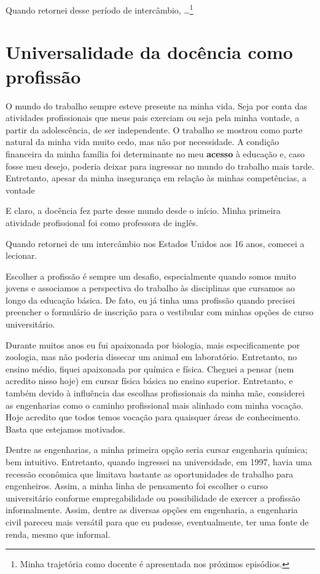 \documentclass[
]{book}
\begin{document}
Quando retornei desse período de intercâmbio, \ldots{}\footnote{Minha
  trajetória como docente é apresentada nos próximos episódios.}

\hypertarget{universalidade-da-docuxeancia-como-profissuxe3o}{%
\chapter{Universalidade da docência como
profissão}\label{universalidade-da-docuxeancia-como-profissuxe3o}}

O mundo do trabalho sempre esteve presente na minha vida. Seja por conta
das atividades profissionais que meus pais exerciam ou seja pela minha
vontade, a partir da adolescência, de ser independente. O trabalho se
mostrou como parte natural da minha vida muito cedo, mas não por
necessidade. A condição financeira da minha família foi determinante no
meu \textbf{acesso} à educação e, caso fosse meu desejo, poderia deixar
para ingressar no mundo do trabalho mais tarde. Entretanto, apesar da
minha insegurança em relação às minhas competências, a vontade

E claro, a docência fez parte desse mundo desde o início. Minha primeira
atividade profissional foi como professora de inglês.

Quando retornei de um intercâmbio nos Estados Unidos aos 16 anos,
comecei a lecionar.

Escolher a profissão é sempre um desafio, especialmente quando somos
muito jovens e associamos a perspectiva do trabalho às disciplinas que
cursamos ao longo da educação básica. De fato, eu já tinha uma profissão
quando precisei preencher o formulário de inscrição para o vestibular
com minhas opções de curso universitário.

Durante muitos anos eu fui apaixonada por biologia, mais especificamente
por zoologia, mas não poderia dissecar um animal em laboratório.
Entretanto, no ensino médio, fiquei apaixonada por química e física.
Cheguei a pensar (nem acredito nisso hoje) em cursar física básica no
ensino superior. Entretanto, e também devido à influência das escolhas
profissionais da minha mãe, considerei as engenharias como o caminho
profissional mais alinhado com minha vocação. Hoje acredito que todos
temos vocação para quaisquer áreas de conhecimento. Basta que estejamos
motivados.

Dentre as engenharias, a minha primeira opção seria cursar engenharia
química; bem intuitivo. Entretanto, quando ingressei na universidade, em
1997, havia uma recessão econômica que limitava bastante as
oportunidades de trabalho para engenheiros. Assim, a minha linha de
pensamento foi escolher o curso universitário conforme empregabilidade
ou possibilidade de exercer a profissão informalmente. Assim, dentre as
diversas opções em engenharia, a engenharia civil pareceu mais versátil
para que eu pudesse, eventualmente, ter uma fonte de renda, mesmo que
informal.
\end{document}
